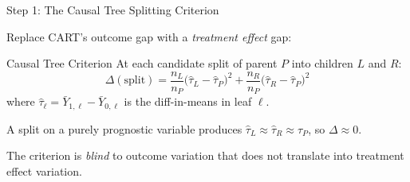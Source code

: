 \documentclass[aspectratio=169, 11pt, handout]{beamer}
\begin{document}
\begin{frame}{Step 1: The Causal Tree Splitting Criterion}
 
Replace CART's outcome gap with a \emph{treatment effect} gap:
 
\bigskip
 
\begin{block}{Causal Tree Criterion}
At each candidate split of parent $P$ into children $L$ and $R$:
\[
\Delta(\text{split}) = \frac{n_L}{n_P}\bigl(\hat{\tau}_L - \hat{\tau}_P\bigr)^2 + \frac{n_R}{n_P}\bigl(\hat{\tau}_R - \hat{\tau}_P\bigr)^2
\]
where $\hat{\tau}_\ell = \bar{Y}_{1,\ell} - \bar{Y}_{0,\ell}$ is the diff-in-means in leaf $\ell$.
\end{block}
 
\pause
\bigskip
 
A split on a purely prognostic variable produces $\hat{\tau}_L \approx \hat{\tau}_R \approx \hat{\tau}_P$, so $\Delta \approx 0$.
 
The criterion is \emph{blind} to outcome variation that does not translate into treatment effect variation.
 
\end{frame}
 
\end{document}
